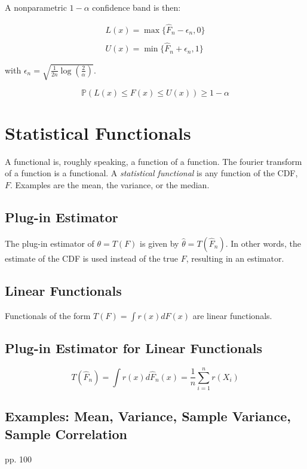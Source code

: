 A nonparametric $1-\alpha$ confidence band is then:

\begin{equation}
\begin{array}{c}
L(x) = \max\{\hat{F}_n -\epsilon_n, 0 \}\\
\\
U(x) = \min\{\hat{F}_n + \epsilon_n, 1\}
\end{array}
\end{equation}

with $\epsilon_n = \sqrt{\frac{1}{2n}\log\left(\frac{2}{\alpha}\right)}$.

\begin{equation}
\mathbb{P}\left(L(x) \leq F(x) \leq U(x) \right) \geq 1-\alpha
\end{equation}



\section{Statistical Functionals}
A functional is, roughly speaking, a function of a function. The fourier transform of a function is a functional. A \textit{statistical functional} is any function of the CDF, $F$. Examples are the mean, the variance, or the median. 

\subsection{Plug-in Estimator}
The plug-in estimator of $\theta = T(F)$ is given by $\hat{\theta} = T(\hat{F}_n)$. In other words, the estimate of the CDF is used instead of the true $F$, resulting in an estimator.

\subsection{Linear Functionals}
Functionals of the form $T(F) = \int r(x) dF(x)$ are linear functionals.  

\subsection{Plug-in Estimator for Linear Functionals}
\begin{equation}
T(\hat{F}_n) = \int r(x) d\hat{F}_n(x) = \frac{1}{n}\sum^{n}_{i=1}r(X_i)
\end{equation}

\subsection{Examples: Mean, Variance, Sample Variance, Sample Correlation}
 pp. 100
